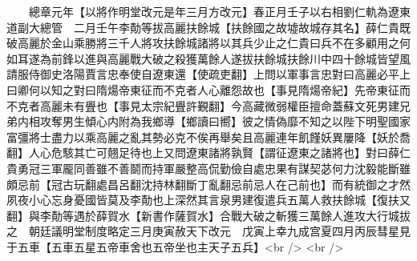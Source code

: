 　　總章元年【以將作明堂改元是年三月方改元】春正月壬子以右相劉仁軌為遼東道副大總管　二月壬午李勣等拔高麗扶餘城【扶餘國之故墟故城存其名】薛仁貴既破高麗於金山乘勝將三千人將攻扶餘城諸將以其兵少止之仁貴曰兵不在多顧用之何如耳遂為前鋒以進與高麗戰大破之殺獲萬餘人遂拔扶餘城扶餘川中四十餘城皆望風請服侍御史洛陽賈言忠奉使自遼東還【使疏吏翻】上問以軍事言忠對曰高麗必平上曰卿何以知之對曰隋煬帝東征而不克者人心離怨故也【事見隋煬帝紀】先帝東征而不克者高麗未有舋也【事見太宗紀舋許覲翻】今高藏微弱權臣擅命蓋蘇文死男建兄弟内相攻奪男生傾心内附為我鄉導【鄉讀曰嚮】彼之情偽靡不知之以陛下明聖國家富彊將士盡力以乘高麗之亂其勢必克不俟再舉矣且高麗連年飢饉妖異屢降【妖於喬翻】人心危駭其亡可翹足待也上又問遼東諸將孰賢【謂征遼東之諸將也】對曰薛仁貴勇冠三軍龎同善雖不善鬬而持軍嚴整高侃勤儉自處忠果有謀契苾何力沈毅能斷雖頗忌前【冠古玩翻處昌呂翻沈持林翻斷丁亂翻忌前忌人在己前也】而有統御之才然夙夜小心忘身憂國皆莫及李勣也上深然其言泉男建復遣兵五萬人救扶餘城【復扶又翻】與李勣等遇於薛賀水【新書作薩賀水】合戰大破之斬獲三萬餘人進攻大行城拔之　朝廷議明堂制度略定三月庚寅赦天下改元　戊寅上幸九成宫夏四月丙辰彗星見于五車【五車五星五帝車舍也五帝坐也主天子五兵】<br />
<br />
